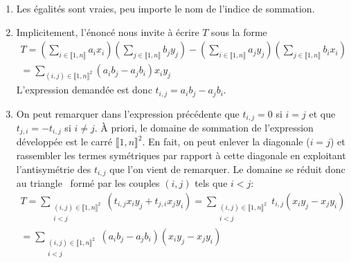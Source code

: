 \begin{enumerate}
 \item Les égalités sont vraies, peu importe le nom de l'indice de sommation.
 
 \item Implicitement, l'énoncé nous invite à écrire $T$ sous la forme
\begin{multline*}
T = \left(\sum_{i\in \llbracket 1,n\rrbracket}a_i x_i\right) \left( \sum_{j \in \llbracket 1,n\rrbracket} b_j y_j\right)  
 - \left(\sum_{i\in \llbracket 1,n\rrbracket}a_j y_j\right) \left( \sum_{j \in \llbracket 1,n\rrbracket} b_i x_i\right) \\
 = \sum_{(i,j)\in \llbracket 1,n \rrbracket^2}(a_ib_j - a_jb_i) x_i y_j
\end{multline*}
L'expression demandée est donc $t_{i,j} = a_ib_j - a_jb_i$. 

 \item On peut remarquer dans l'expression précédente que $t_{i,j} = 0$ si $i=j$ et que $t_{j,i} = -t_{i,j}$ si $i\neq j$.\newline
 \`A priori, le domaine de sommation de l'expression développée est le carré $\llbracket 1,n \rrbracket^2$. En fait, on peut enlever la diagonale ($i=j$) et rassembler les termes symétriques par rapport à cette diagonale en exploitant l'antisymétrie des $t_{i,j}$ que l'on vient de remarquer.\newline
 Le domaine se réduit donc au \og triangle\fg~ formé par les couples $(i,j)$ tels que $i<j$:
 \begin{multline*}
  T = \sum_{\substack{(i,j)\in \llbracket 1,n\rrbracket^2 \\ i < j}}(t_{i,j}x_i y_j + t_{j,i}x_j y_i)
  = \sum_{\substack{(i,j)\in \llbracket 1,n\rrbracket^2 \\ i < j}}t_{i,j}(x_i y_j - x_j y_i) \\
  = \sum_{\substack{(i,j)\in \llbracket 1,n\rrbracket^2 \\ i < j}} (a_ib_j - a_jb_i) (x_i y_j - x_j y_i) 
 \end{multline*}
  

\end{enumerate}
